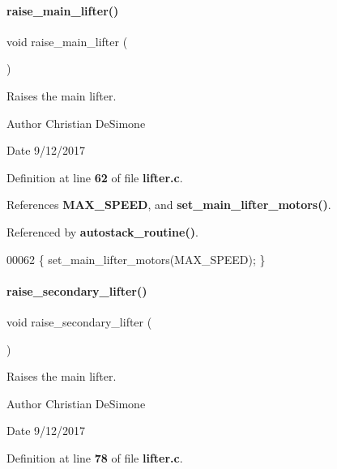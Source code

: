 \paragraph{raise\+\_\+main\+\_\+lifter()}
{\footnotesize\ttfamily void raise\+\_\+main\+\_\+lifter (\begin{DoxyParamCaption}{ }\end{DoxyParamCaption})}



Raises the main lifter. 

\begin{DoxyAuthor}{Author}
Christian De\+Simone 
\end{DoxyAuthor}
\begin{DoxyDate}{Date}
9/12/2017 
\end{DoxyDate}


Definition at line \textbf{ 62} of file \textbf{ lifter.\+c}.



References \textbf{ M\+A\+X\+\_\+\+S\+P\+E\+ED}, and \textbf{ set\+\_\+main\+\_\+lifter\+\_\+motors()}.



Referenced by \textbf{ autostack\+\_\+routine()}.


\begin{DoxyCode}
00062 \{ set_main_lifter_motors(MAX_SPEED); \}
\end{DoxyCode}
\mbox{\label{a00107_a786f679ea48bb8c80e00fbac9a69911b}} 
\paragraph{raise\+\_\+secondary\+\_\+lifter()}
{\footnotesize\ttfamily void raise\+\_\+secondary\+\_\+lifter (\begin{DoxyParamCaption}{ }\end{DoxyParamCaption})}



Raises the main lifter. 

\begin{DoxyAuthor}{Author}
Christian De\+Simone 
\end{DoxyAuthor}
\begin{DoxyDate}{Date}
9/12/2017 
\end{DoxyDate}


Definition at line \textbf{ 78} of file \textbf{ lifter.\+c}.




